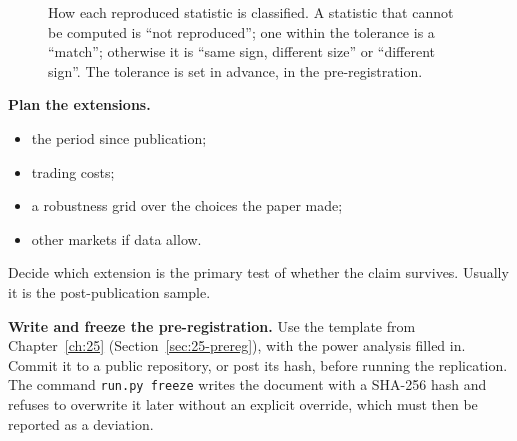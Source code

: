 \begin{figure}[htbp]
\centering
{}
\caption{How each reproduced statistic is classified. A statistic that cannot be computed is ``not reproduced''; one within the tolerance is a ``match''; otherwise it is ``same sign, different size'' or ``different sign''. The tolerance is set in advance, in the pre-registration.}
\label{fig:26-status}
\end{figure}

\textbf{Plan the extensions.}

\begin{itemize}
  \item the period since publication;
  \item trading costs;
  \item a robustness grid over the choices the paper made;
  \item other markets if data allow.
\end{itemize}

Decide which extension is the primary test of whether the claim survives. Usually it is the post-publication sample.

\textbf{Write and freeze the pre-registration.} Use the template from Chapter~\ref{ch:25} (Section~\ref{sec:25-prereg}), with the power analysis filled in. Commit it to a public repository, or post its hash, before running the replication. The command \texttt{run.py freeze} writes the document with a SHA-256 hash and refuses to overwrite it later without an explicit override, which must then be reported as a deviation.

